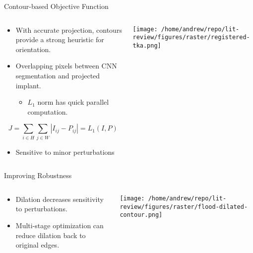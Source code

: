 \documentclass[presentation, aspectratio=1610]{beamer}
\begin{document}
\begin{frame}[label={sec:orgb2a6b84}]{Contour-based Objective Function}
\begin{columns}
\begin{column}{0.5\columnwidth}
\begin{itemize}
\item With accurate projection, contours provide a strong heuristic for orientation.
\item Overlapping pixels between CNN segmentation and projected implant.
\begin{itemize}
\item \(L_1\) norm has quick parallel computation.
\end{itemize}
\end{itemize}

\begin{equation*}
  J = \sum_{i \in H}\sum_{j \in W}|I_{ij} - P_{ij}| = L_{1}(I,P)
\end{equation*}

\begin{itemize}
\item Sensitive to minor perturbations
\end{itemize}
\end{column}
\begin{column}{0.6\columnwidth}
\begin{center}
\texttt{[image: /home/andrew/repo/lit-review/figures/raster/registered-tka.png]}
\end{center}
\end{column}
\end{columns}
\end{frame}
\begin{frame}[label={sec:orgf6a54bf}]{Improving Robustness}
\begin{columns}
\begin{column}{0.5\columnwidth}
\begin{itemize}
\item Dilation decreases sensitivity to perturbations.
\item Multi-stage optimization can reduce dilation back to original edges.
\end{itemize}
\end{column}
\begin{column}{0.6\columnwidth}
\begin{center}
\texttt{[image: /home/andrew/repo/lit-review/figures/raster/flood-dilated-contour.png]}
\end{center}
\end{column}
\end{columns}
\end{frame}
\end{document}
